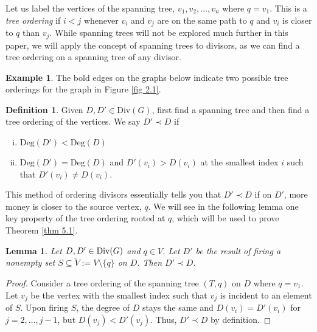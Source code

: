 \documentclass[openany, amssymb, psamsfonts]{amsart}
\newtheorem{lem}{Lemma}[section]
\theoremstyle{definition}
\newtheorem{defn}{Definition}[section]
\newtheorem{exmp}{Example}[section]
\numberwithin{equation}{section}
\begin{document}
Let us label the vertices of the spanning tree, $v_1, v_2,\dots,v_n$ where $q=v_1$. This is a \textit{tree ordering} if $i<j$ whenever $v_i$ and $v_j$ are on the same path to $q$ and $v_i$ is closer to $q$ than $v_j$. While spanning trees will not be explored much further in this paper, we will apply the concept of spanning trees to divisors, as we can find a tree ordering on a spanning tree of any divisor. 

\begin{exmp}
The bold edges on the graphs below indicate two possible tree orderings for the graph in Figure \ref{fig 2.1}.
\begin{center}
    
\end{center}
\end{exmp}

\begin{defn}
\label{defn 5.3}
Given $D, D'\in \text{Div}(G)$, first find a spanning tree and then find a tree ordering of the vertices. We say $D'\prec D$ if 
\begin{enumerate}[(i)]
    \item $\text{Deg}(D')<\text{Deg}(D)$
    \item $\text{Deg}(D')=\text{Deg}(D)$ and $D'(v_i)>D(v_i)$ at the smallest index $i$ such that $D'(v_i)\neq D(v_i)$.
\end{enumerate}
\end{defn}

This method of ordering divisors essentially tells you that $D'\prec D$ if on $D'$, more money is closer to the source vertex, $q$. We will see in the following lemma one key property of the tree ordering rooted at $q$, which will be used to prove Theorem \ref{thm 5.1}.

\begin{lem}
\label{lem 5.1}
Let $D, D'\in \textup{Div}(G)$ and $q\in V$. Let $D'$ be the result of firing a nonempty set $S\subseteq \tilde{V}:=V\setminus \{q\}$ on $D$. Then $D'\prec D$.
\end{lem}
\begin{proof}
Consider a tree ordering of the spanning tree $(T, q)$ on $D$ where $q=v_1$. Let $v_j$ be the vertex with the smallest index such that $v_j$ is incident to an element of $S$. Upon firing $S$, the degree of $D$ stays the same and $D(v_i)=D'(v_i)$ for $j=2,\dots,j-1$, but $D(v_j)<D'(v_j)$. Thus, $D'\prec D$ by definition. 
\end{proof}
\end{document}
